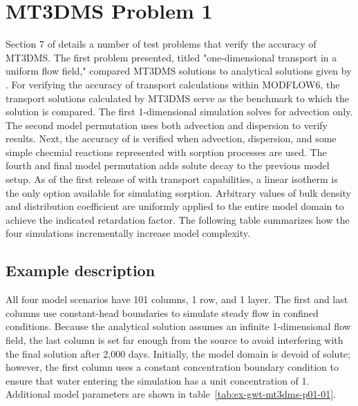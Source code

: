 \section{MT3DMS Problem 1}

Section 7 of \cite{zheng1999mt3dms} details a number of test problems that verify the accuracy of MT3DMS.  The first problem presented, titled "one-dimensional transport in a uniform flow field," compared MT3DMS solutions to analytical solutions given by \cite{vanGenuchtenAlves1982}.  For verifying the accuracy of transport calculations within MODFLOW6, the transport solutions calculated by MT3DMS serve as the benchmark to which the \mf solution is compared.  The first 1-dimensional simulation solves for advection only.  The second model permutation uses both advection and dispersion to verify \mf results.  Next, the accuracy of \mf is verified when advection, dispersion, and some simple checmial reactions represented with sorption processes are used.  The fourth and final model permutation adds solute decay to the previous model setup. As of the first release of \mf with transport capabilities, a linear isotherm is the only option available for simulating sorption. Arbitrary values of bulk density and distribution coefficient are uniformly applied to the entire model domain to achieve the indicated retardation factor. The following table summarizes how the four simulations incrementally increase model complexity.



\subsection{Example description}

All four model scenarios have 101 columns, 1 row, and 1 layer. The first and last columns use constant-head boundaries to simulate steady flow in confined conditions. Because the analytical solution assumes an infinite 1-dimensional flow field, the last column is set far enough from the source to avoid interfering with the final solution after 2,000 days. Initially, the model domain is devoid of solute; however, the first column uses a constant concentration boundary condition to ensure that water entering the simulation has a unit concentration of 1. Additional model parameters are shown in table~\ref{tab:ex-gwt-mt3dms-p01-01}.



